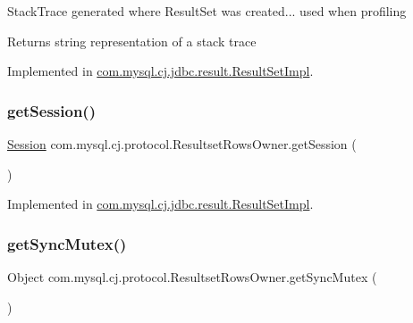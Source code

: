Stack\+Trace generated where Result\+Set was created... used when profiling

\begin{DoxyReturn}{Returns}
string representation of a stack trace 
\end{DoxyReturn}


Implemented in \mbox{\hyperlink{classcom_1_1mysql_1_1cj_1_1jdbc_1_1result_1_1_result_set_impl_acc4c2166c7861185dcae5b467bc557ec}{com.\+mysql.\+cj.\+jdbc.\+result.\+Result\+Set\+Impl}}.

\mbox{\label{interfacecom_1_1mysql_1_1cj_1_1protocol_1_1_resultset_rows_owner_a4db30351e43e500e977f3bee6d667fb8}} 
\subsubsection{\texorpdfstring{get\+Session()}{getSession()}}
{\footnotesize\ttfamily \mbox{\hyperlink{interfacecom_1_1mysql_1_1cj_1_1_session}{Session}} com.\+mysql.\+cj.\+protocol.\+Resultset\+Rows\+Owner.\+get\+Session (\begin{DoxyParamCaption}{ }\end{DoxyParamCaption})}



Implemented in \mbox{\hyperlink{classcom_1_1mysql_1_1cj_1_1jdbc_1_1result_1_1_result_set_impl_a0dea8cd7b4abcf189649cd1d2e65f6bc}{com.\+mysql.\+cj.\+jdbc.\+result.\+Result\+Set\+Impl}}.

\mbox{\label{interfacecom_1_1mysql_1_1cj_1_1protocol_1_1_resultset_rows_owner_ae1c4062c21dff082c4f8ab97c59b33c3}} 
\subsubsection{\texorpdfstring{get\+Sync\+Mutex()}{getSyncMutex()}}
{\footnotesize\ttfamily Object com.\+mysql.\+cj.\+protocol.\+Resultset\+Rows\+Owner.\+get\+Sync\+Mutex (\begin{DoxyParamCaption}{ }\end{DoxyParamCaption})}



